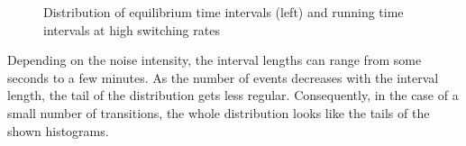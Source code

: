 \documentclass[12pt,a4paper]{article}
\begin{document}
\begin{figure}[H]
	\hspace*{-0.5cm}
	\caption{Distribution of equilibrium time intervals (left) and running time intervals at high switching rates}
	\label{intdistgood}
\end{figure}
Depending on the noise intensity, the interval lengths can range from some seconds to a few minutes. As the number of events decreases with the interval length, the tail of the distribution gets less regular. Consequently, in the case of a small number of transitions, the whole distribution looks like the tails of the shown histograms.
\end{document}
